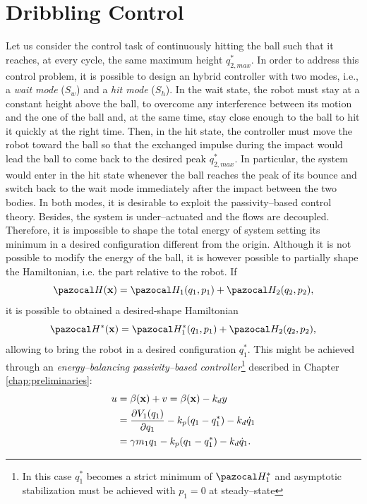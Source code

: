 \section{Dribbling Control}\label{sec:control}
%
Let us consider the control task of continuously hitting the ball such that it reaches, at every cycle, the same maximum height $q_{2,max}^*$. In order to address this control problem, it is possible to design an hybrid controller with two modes, i.e., a \textit{wait mode} ($S_{w}$) and a \textit{hit mode} ($S_{h}$). In the wait state, the robot must stay at a constant height above the ball, to overcome any interference between its motion and the one of the ball and, at the same time, stay close enough to the ball to hit it quickly at the right time.
Then, in the hit state, the controller must move the robot toward the ball so that the exchanged impulse during the impact would lead the ball to come back to the desired peak $q_{2,max}^*$. In particular, the system would enter in the hit state whenever the ball reaches the peak of its bounce and switch back to the wait mode immediately after the impact between the two bodies. 
%
In both modes, it is desirable to exploit the passivity--based control theory. Besides, the system is under--actuated and the flows are decoupled. Therefore, it is impossible to shape the total energy of system setting its minimum in a desired configuration different from the origin. Although it is not possible to modify the energy of the ball, it is however possible to partially shape the Hamiltonian, i.e. the part relative to the robot. If 
%
\begin{equation}
    \Ha(\xb) = \Ha_1(q_1,p_1) + \Ha_2(q_2,p_2),
\end{equation}
%
it is possible to obtained a desired-shape Hamiltonian
%
\begin{equation}
     \Ha^*(\xb)  = \Ha_1^*(q_1,p_1) + \Ha_2(q_2,p_2),
\end{equation}
%
allowing to bring the robot in a desired configuration $q_1^*$. This might be achieved through an \textit{energy--balancing passivity--based controller}\footnote{In this case $q_1^*$ becomes a strict minimum of $\Ha_1^*$ and asymptotic stabilization must be achieved with $p_1 = 0$ at steady--state} \citep{ortega2001putting,ortega2008control,secchi2007control} described in Chapter \ref{chap:preliminaries}:
%
\begin{align}
u &= \beta(\mathbf{x}) + v = \beta(\mathbf{x}) - k_dy \\
&= \frac{\partial V_1(q_1)}{\partial q_1} - k_p(q_1 -q_1^*) - k_d\dot{q}_1\\
&= \gamma m_1q_1- k_p(q_1 -q_1^*) - k_d\dot{q}_1.
\end{align}
%

